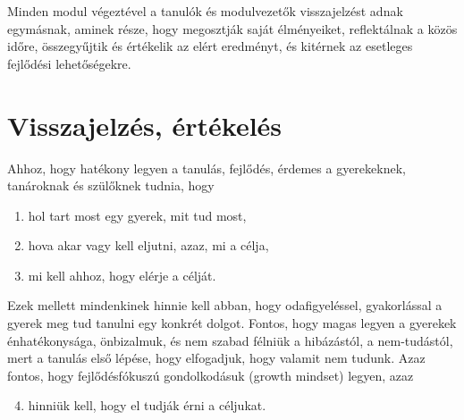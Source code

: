 Minden modul végeztével a tanulók és modulvezetők visszajelzést adnak
egymásnak, aminek része, hogy megosztják saját élményeiket, reflektálnak a
közös időre, összegyűjtik és értékelik az elért eredményt, és kitérnek az
esetleges fejlődési lehetőségekre.

\section{Visszajelzés, értékelés}
\label{sec:ertekeles}
Ahhoz, hogy hatékony legyen a tanulás, fejlődés, érdemes a gyerekeknek,
tanároknak és szülőknek tudnia, hogy
\begin{enumerate}
  \item hol tart most egy gyerek, mit tud most,
  \item hova akar vagy kell eljutni, azaz, mi a célja,
  \item mi kell ahhoz, hogy elérje a célját.
\end{enumerate}
Ezek mellett mindenkinek hinnie kell abban, hogy odafigyeléssel, gyakorlással a
gyerek meg tud tanulni egy konkrét dolgot. Fontos, hogy magas legyen a gyerekek
énhatékonysága, önbizalmuk, és nem szabad félniük a hibázástól, a nem-tudástól,
mert a tanulás első lépése, hogy elfogadjuk, hogy valamit nem tudunk. Azaz
fontos, hogy fejlődésfókuszú gondolkodásuk (growth mindset)
\citep{growthmindset} legyen, azaz
\begin{enumerate}
  \setcounter{enumi}{3}
  \item hinniük kell, hogy el tudják érni a céljukat.
\end{enumerate}


